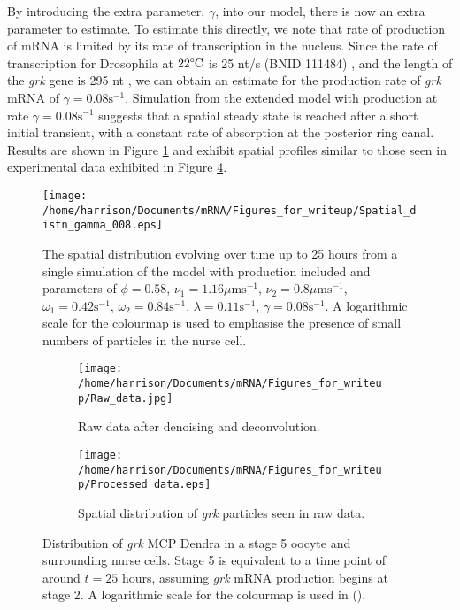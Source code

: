 \documentclass[twocolumn]{biophys}
\begin{document}
By introducing the extra parameter, $\gamma$, into our model, there is now an extra parameter to estimate. 
To estimate this directly, we note that rate of production of mRNA is limited by its rate of transcription in the nucleus.
Since the rate of transcription for Drosophila at $22 \degree \text{C}$ is 25 nt/s (BNID 111484) \citep{milo2010bionumbers}, and the length of the \textit{grk} gene is 295 nt \cite{marygold2013flybase}, we can obtain an estimate for the production rate of \textit{grk} mRNA of $\gamma = 0.08 \text{s}^{-1}$.
Simulation from the extended model with production at rate $\gamma=0.08 \text{s}^{-1}$ suggests that a spatial steady state is reached after a short initial transient, with a constant rate of absorption at the posterior ring canal.
Results are shown in Figure \ref{FIG:Production_sim} and exhibit spatial profiles similar to those seen in experimental data exhibited in Figure \ref{FIG:Raw_and_processed_data}.
\begin{figure}[h]
 \centering
 \texttt{[image: /home/harrison/Documents/mRNA/Figures\_for\_writeup/Spatial\_distn\_gamma\_008.eps]}
 \caption{The spatial distribution evolving over time up to 25 hours from a single simulation of the model with production included and parameters of $\phi=0.58$, $\nu_1=1.16 \mu \text{ms}^{-1}$, $\nu_2=0.8 \mu \text{ms}^{-1}$, $\omega_1=0.42 \text{s}^{-1}$, $\omega_2=0.84 \text{s}^{-1}$, $\lambda=0.11 \text{s}^{-1}$, $\gamma = 0.08 \text{s}^{-1}$. 
 A logarithmic scale for the colourmap is used to emphasise the presence of small numbers of particles in the nurse cell.}
 \label{FIG:Production_sim}
\end{figure}

\begin{figure} 
        \centering
        \begin{subfigure}[h]{0.76\columnwidth}
                \texttt{[image: /home/harrison/Documents/mRNA/Figures\_for\_writeup/Raw\_data.jpg]}
                \caption{Raw data after denoising and deconvolution.}
                \label{fig:aa}
        \end{subfigure}%
        
        
        \begin{subfigure}[h]{0.86\columnwidth}
                \texttt{[image: /home/harrison/Documents/mRNA/Figures\_for\_writeup/Processed\_data.eps]}
                \caption{Spatial distribution of \textit{grk} particles seen in raw data.}
                \label{fig:bb}
        \end{subfigure}
        
        \caption{Distribution of \textit{grk} MCP Dendra in a stage 5  oocyte and surrounding nurse cells. Stage 5 is equivalent to a time point of around $t=25$ hours, assuming \textit{grk} mRNA production begins at stage 2. A logarithmic scale for the colourmap is used in ().}
        \label{FIG:Raw_and_processed_data}
\end{figure}
\end{document}
